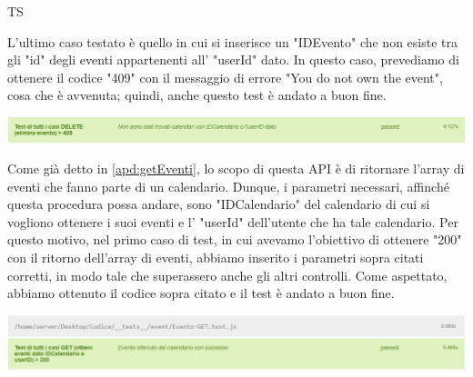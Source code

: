 \begin{listaPersonale}{TS}
\begin{center}
                \end{center}
                L'ultimo caso testato è quello in cui si inserisce un "IDEvento" che non esiste tra gli "id" degli eventi appartenenti all' "userId" dato. In questo caso, prevediamo di ottenere il codice "409" con il messaggio di errore "You do not own the event", cosa che è avvenuta; quindi, anche questo test è andato a buon fine.
                \begin{center}
                        \includegraphics[width=1\textwidth, height=0.04\textheight]{img/png/tests/EventoDelete/409_DeleteEvento.png}
                \end{center}
                Come già detto in \ref{apd:getEventi}, lo scopo di questa API è di ritornare l'array di eventi che fanno parte di un calendario. Dunque, i parametri necessari, affinché questa procedura possa andare, sono "IDCalendario" del calendario di cui si vogliono ottenere i suoi eventi e l' "userId" dell'utente che ha tale calendario. Per questo motivo, nel primo caso di test, in cui avevamo l'obiettivo di ottenere "200" con il ritorno dell'array di eventi, abbiamo inserito i parametri sopra citati corretti, in modo tale che superassero anche gli altri controlli. Come aspettato, abbiamo ottenuto il codice sopra citato e il test è andato a buon fine.
                \begin{center}
                        \includegraphics[width=1\textwidth, height=0.07\textheight]{img/png/tests/EventoGet/200_getEventi.png}

\end{center}
\end{listaPersonale}
